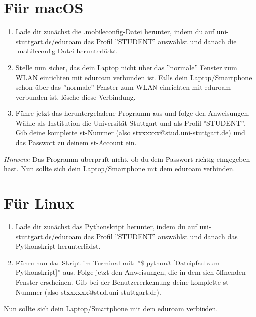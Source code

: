 \section*{Für macOS}
\begin{enumerate}
    \item Lade dir zunächst die .mobileconfig-Datei herunter, indem du auf \href{\eduroamurllinux}{uni-stuttgart.de/eduroam} das Profil ''STUDENT'' auswählst und danach die .mobileconfig-Datei herunterlädst.\newline
    \item Stelle nun sicher, das dein Laptop nicht über das ''normale'' Fenster zum WLAN einrichten mit eduroam verbunden ist. Falls dein Laptop/Smartphone schon über das ''normale'' Fenster zum WLAN einrichten mit eduroam verbunden ist, lösche diese Verbindung.\newline
    \item Führe jetzt das heruntergeladene Programm aus und folge den Anweisungen. Wähle als Institution die Universität Stuttgart und als Profil ''STUDENT''. Gib deine komplette st-Nummer (also stxxxxxx@stud.uni-stuttgart.de) und das Passwort zu deinem st-Account ein.\newline
\end{enumerate}
\textit{Hinweis:} Das Programm überprüft nicht, ob du dein Passwort richtig eingegeben hast.\newline
Nun sollte sich dein Laptop/Smartphone mit dem eduroam verbinden.

\section*{Für Linux}
\begin{enumerate}
    \item Lade dir zunächst das Pythonskript herunter, indem du auf \href{\eduroamurllinux}{uni-stuttgart.de/eduroam} das Profil ''STUDENT'' auswählst und danach das Pythonskript herunterlädst.
    \item Führe nun das Skript im Terminal mit: ''\$ python3 [Dateipfad zum Pythonskript]'' aus. 
    Folge jetzt den Anweisungen, die in dem sich öffnenden Fenster erscheinen. 
    Gib bei der Benutzererkennung deine komplette st-Nummer (also stxxxxxx@stud.uni-stuttgart.de).
\end{enumerate}
Nun sollte sich dein Laptop/Smartphone mit dem eduroam verbinden.
